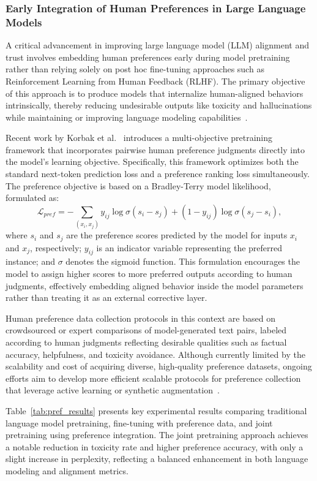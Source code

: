 \documentclass[sigconf]{acmart}
\begin{document}
\subsubsection{Early Integration of Human Preferences in Large Language Models}

A critical advancement in improving large language model (LLM) alignment and trust involves embedding human preferences early during model pretraining rather than relying solely on post hoc fine-tuning approaches such as Reinforcement Learning from Human Feedback (RLHF). The primary objective of this approach is to produce models that internalize human-aligned behaviors intrinsically, thereby reducing undesirable outputs like toxicity and hallucinations while maintaining or improving language modeling capabilities~\cite{ref41}.

Recent work by Korbak et al.~\cite{ref41} introduces a multi-objective pretraining framework that incorporates pairwise human preference judgments directly into the model's learning objective. Specifically, this framework optimizes both the standard next-token prediction loss and a preference ranking loss simultaneously. The preference objective is based on a Bradley-Terry model likelihood, formulated as:
\[
\mathcal{L}_{pref} = - \sum_{(x_i, x_j)} y_{ij} \log \sigma(s_i - s_j) + (1 - y_{ij}) \log \sigma(s_j - s_i),
\]
where $s_i$ and $s_j$ are the preference scores predicted by the model for inputs $x_i$ and $x_j$, respectively; $y_{ij}$ is an indicator variable representing the preferred instance; and $\sigma$ denotes the sigmoid function. This formulation encourages the model to assign higher scores to more preferred outputs according to human judgments, effectively embedding aligned behavior inside the model parameters rather than treating it as an external corrective layer.

Human preference data collection protocols in this context are based on crowdsourced or expert comparisons of model-generated text pairs, labeled according to human judgments reflecting desirable qualities such as factual accuracy, helpfulness, and toxicity avoidance. Although currently limited by the scalability and cost of acquiring diverse, high-quality preference datasets, ongoing efforts aim to develop more efficient scalable protocols for preference collection that leverage active learning or synthetic augmentation~\cite{ref41}.

Table~\ref{tab:pref_results} presents key experimental results comparing traditional language model pretraining, fine-tuning with preference data, and joint pretraining using preference integration. The joint pretraining approach achieves a notable reduction in toxicity rate and higher preference accuracy, with only a slight increase in perplexity, reflecting a balanced enhancement in both language modeling and alignment metrics.
\end{document}
